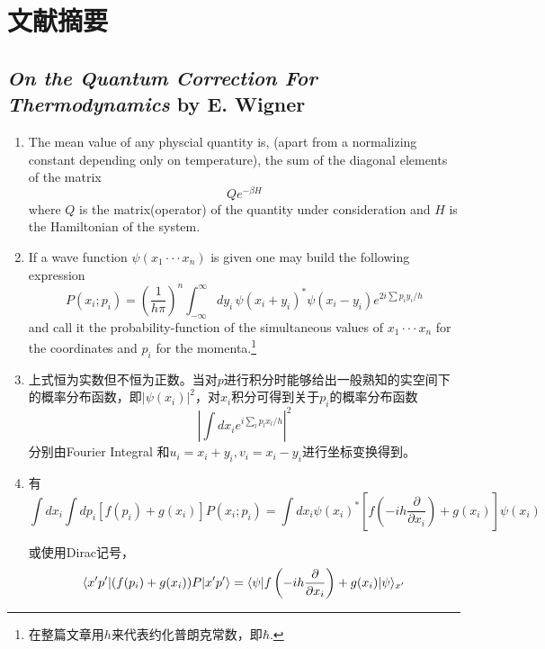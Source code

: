 \chapter{文献摘要}
\section{\emph{On the Quantum Correction For Thermodynamics} by E. Wigner}
\begin{enumerate}
	\item The mean value of any physcial quantity is, (apart from a normalizing constant depending only on temperature), the sum of the diagonal elements of the matrix
	\begin{equation}
	Qe^{-\beta H}
	\end{equation}
	where $Q$ is the matrix(operator) of the quantity under consideration and $H$ is the Hamiltonian of the system.

	\item If a wave function $\psi(x_1 \cdot \cdot \cdot x_n)$ is given one may build the following expression
	\begin{equation}
	P(x_i;p_i)=\left(\frac{1}{h\pi}\right)^n\int_{-\infty}^\infty dy_i\, \psi(x_i+y_i)^*\psi(x_i-y_i)e^{2i\sum p_iy_i/h}
	\label{Pdef}
	\end{equation}
	and call it the probability-function of the simultaneous values of $x_1 \cdot \cdot \cdot x_n$ for the coordinates and $p_i$ for the momenta.\footnote{在整篇文章用$h$来代表约化普朗克常数，即$\hbar$.}

	\item 上式恒为实数但不恒为正数。当对$p$进行积分时能够给出一般熟知的实空间下的概率分布函数，即$|\psi(x_i)|^2$，对$x_i$积分可得到关于$p_i$的概率分布函数
	\begin{equation}
	\left|\int dx_i e^{i\sum_l{p_lx_l}/h} \right| ^2
	\end{equation}
 	分别由Fourier Integral 和$u_i = x_i + y_i,v_i=x_i-y_i$进行坐标变换得到。

 	\item 有
 	\begin{equation}
 	\int dx_i \int d p_i [f(p_i) + g(x_i)]P(x_i;p_i)=\int dx_i\psi(x_i)^*[f\left(-ih\frac{\partial}{\partial x_i}\right)+g(x_i)]\psi(x_i)
 	\end{equation}

 	或使用Dirac记号，
 	\begin{equation}
 	\langle x'p' | (f(p_i)+g(x_i))P | x'p' \rangle=\langle \psi | f\left(-ih\frac{\partial}{\partial x_i}\right)+g(x_i) | \psi \rangle_{x'}
 	\end{equation}


\end{enumerate}
